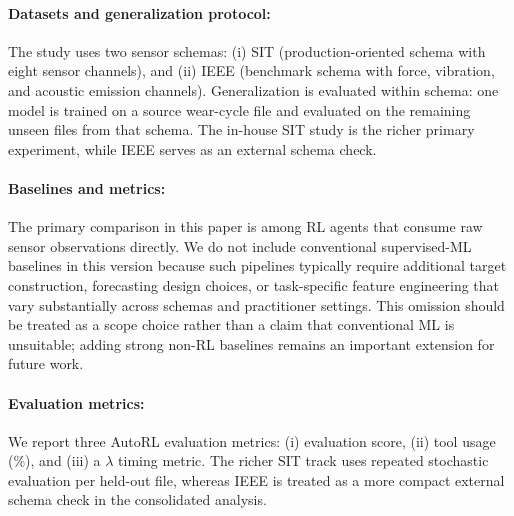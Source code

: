 \documentclass[sn-basic]{sn-jnl} %
\begin{document}
\paragraph{Datasets and generalization protocol:}
The study uses two sensor schemas: (i) SIT (production-oriented schema with eight sensor channels), and (ii) IEEE (benchmark schema with force, vibration, and acoustic emission channels). Generalization is evaluated within schema: one model is trained on a source wear-cycle file and evaluated on the remaining unseen files from that schema. The in-house SIT study is the richer primary experiment, while IEEE serves as an external schema check.

\paragraph{Baselines and metrics:}
\label{sec:metrics}
The primary comparison in this paper is among RL agents that consume raw sensor observations directly. We do not include conventional supervised-ML baselines in this version because such pipelines typically require additional target construction, forecasting design choices, or task-specific feature engineering that vary substantially across schemas and practitioner settings. This omission should be treated as a scope choice rather than a claim that conventional ML is unsuitable; adding strong non-RL baselines remains an important extension for future work.

\paragraph{Evaluation metrics:}
We report three AutoRL evaluation metrics: (i) evaluation score, (ii) tool usage (\%), and (iii) a $\lambda$ timing metric. The richer SIT track uses repeated stochastic evaluation per held-out file, whereas IEEE is treated as a more compact external schema check in the consolidated analysis.
\end{document}

